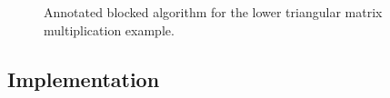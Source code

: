\renewcommand{\precondition}{B = \hat{B} \wedge \LowTr( L ) \wedge \ColDim( L )=\RowDim( B )}

\renewcommand{\postcondition}{B = L \hat{B}}

\renewcommand{\invariant}{
\FlaOneByTwo{ B_L}{B_R} =
\FlaOneByTwo{ L \hat{B}_L }{ \hat{B}_R }
\wedge
\ldots
}

\renewcommand{\guard}{ \neg \SameSize( B, B_L ) }

\renewcommand{\partitionings}{
$ 
B \rightarrow \FlaOneByTwo{ B_{L} }{ B_{R} }
$ and
$ 
\hat{B} \rightarrow \FlaOneByTwo{ \hat{B}_{L} }
                          { \hat{B}_{R} }
$
}
\renewcommand{\partitionsizes}{
$ B_{L} $ and $ \hat{ B }_L $ have $ 0 $ columns
}

\renewcommand{\blocksize}{b}

\renewcommand{\repartitionings}{
$ 
\FlaOneByTwo{ B_L }{ B_R } 
\rightarrow
\FlaOneByThreeR{ B_0 }{ B_1 }{ B_2 }
$
and
$ 
\FlaOneByTwo{ \hat{B}_L }{ \hat{B}_R } 
\rightarrow
\FlaOneByThreeR{ \hat{B}_0 }{ \hat{B}_1 }{ \hat{B}_2 }
$
}
\renewcommand{\repartitionsizes}{
$ B_1 $ and $ \hat{B}_1 $ have $ b $ columns
}

\renewcommand{\moveboundaries}{%
$ 
\FlaOneByTwo{ B_L }{ B_R } 
\leftarrow
\FlaOneByThreeL{ B_0 }{ B_1 }{ B_2 }
$
and
$ 
\FlaOneByTwo{ \hat{B}_L }{ \hat{B}_R } 
\leftarrow
\FlaOneByThreeL{ \hat{B}_0 }{ \hat{B}_1 }{ \hat{B}_2 }
$
}

\renewcommand{\beforeupdate}{
\FlaOneByTwo{ B_0 }{ \FlaOneByTwoSingleLine{ B_1 }{ B_2 } }
=
\FlaOneByTwo{ L \hat{B}_0 }{ \FlaOneByTwoSingleLine{ \hat{B}_1 }{ \hat{B}_2 } }
\wedge \ldots
}

\renewcommand{\afterupdate}{
\FlaOneByTwo{ \FlaOneByTwoSingleLine{ B_0 }{ B_1 } }
{ B_2 }
=
\FlaOneByTwo{ L \FlaOneByTwoSingleLine{ \hat{B}_0 }{ \hat{B}_1 } }{ \hat{B}_2 }
\wedge \ldots
}

\renewcommand{\update}{
\begin{minipage}[t]{4in}
\noindent
$ B_1 \becomes L B_1 $\\
\end{minipage}
}

\begin{figure}[htbp]
\worksheet
\caption{Annotated blocked algorithm for the lower triangular
matrix multiplication example.}
\label{fig:ws:ltrmm_lln3_blk}
\end{figure}

\subsection{Implementation}

